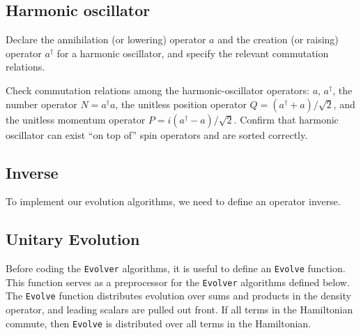 \subsection{Harmonic oscillator}

Declare the annihilation (or lowering) operator $a$ and the creation (or raising) operator $a^{\dagger}$ for a harmonic oscillator, and specify the relevant commutation relations.



Check commutation relations among the harmonic-oscillator operators: $a$, $a^{\dagger}$, the number operator $N = a^{\dagger} a$, the unitless position operator $Q = (a^{\dagger} + a)/\sqrt{2}$, and the unitless momentum operator $P = i (a^{\dagger} - a)/\sqrt{2}$.
Confirm that harmonic oscillator can exist ``on top of'' spin operators and are sorted correctly.



\subsection{Inverse}

To implement our evolution algorithms, we need to define an operator inverse.





\subsection{Unitary Evolution}

Before coding the \verb+Evolver+ algorithms, it is useful to define an \verb+Evolve+ function.
This function serves as a preprocessor for the \verb+Evolver+ algorithms defined below.
The \verb+Evolve+ function distributes evolution over sums and products in the density operator, and leading scalars are pulled out front.
If all terms in the Hamiltonian commute, then \verb+Evolve+ is distributed over all terms in the Hamiltonian. 

